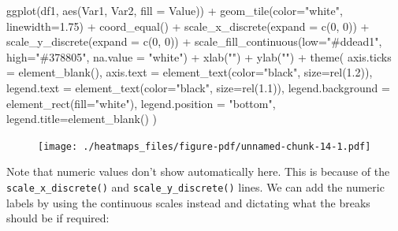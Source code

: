 \documentclass[
  letterpaper,
  DIV=11,
  numbers=noendperiod]{scrreprt}
\newenvironment{Shaded}{\begin{snugshade}}{\end{snugshade}}
\newcommand{\AttributeTok}[1]{\textcolor[rgb]{0.40,0.45,0.13}{#1}}
\newcommand{\DecValTok}[1]{\textcolor[rgb]{0.68,0.00,0.00}{#1}}
\newcommand{\FloatTok}[1]{\textcolor[rgb]{0.68,0.00,0.00}{#1}}
\newcommand{\FunctionTok}[1]{\textcolor[rgb]{0.28,0.35,0.67}{#1}}
\newcommand{\NormalTok}[1]{\textcolor[rgb]{0.00,0.23,0.31}{#1}}
\newcommand{\SpecialCharTok}[1]{\textcolor[rgb]{0.37,0.37,0.37}{#1}}
\newcommand{\StringTok}[1]{\textcolor[rgb]{0.13,0.47,0.30}{#1}}
\begin{document}
\begin{Shaded}
\begin{Highlighting}[]
\FunctionTok{ggplot}\NormalTok{(df1, }\FunctionTok{aes}\NormalTok{(Var1, Var2, }\AttributeTok{fill =}\NormalTok{ Value)) }\SpecialCharTok{+} 
  \FunctionTok{geom\_tile}\NormalTok{(}\AttributeTok{color=}\StringTok{"white"}\NormalTok{, }\AttributeTok{linewidth=}\FloatTok{1.75}\NormalTok{) }\SpecialCharTok{+}
  \FunctionTok{coord\_equal}\NormalTok{() }\SpecialCharTok{+}
  \FunctionTok{scale\_x\_discrete}\NormalTok{(}\AttributeTok{expand =} \FunctionTok{c}\NormalTok{(}\DecValTok{0}\NormalTok{, }\DecValTok{0}\NormalTok{)) }\SpecialCharTok{+}
  \FunctionTok{scale\_y\_discrete}\NormalTok{(}\AttributeTok{expand =} \FunctionTok{c}\NormalTok{(}\DecValTok{0}\NormalTok{, }\DecValTok{0}\NormalTok{)) }\SpecialCharTok{+} 
  \FunctionTok{scale\_fill\_continuous}\NormalTok{(}\AttributeTok{low=}\StringTok{"\#ddead1"}\NormalTok{, }\AttributeTok{high=}\StringTok{"\#378805"}\NormalTok{, }\AttributeTok{na.value =} \StringTok{"white"}\NormalTok{) }\SpecialCharTok{+}
  \FunctionTok{xlab}\NormalTok{(}\StringTok{""}\NormalTok{) }\SpecialCharTok{+} 
  \FunctionTok{ylab}\NormalTok{(}\StringTok{""}\NormalTok{) }\SpecialCharTok{+}
  \FunctionTok{theme}\NormalTok{(}
    \AttributeTok{axis.ticks =} \FunctionTok{element\_blank}\NormalTok{(), }
    \AttributeTok{axis.text =} \FunctionTok{element\_text}\NormalTok{(}\AttributeTok{color=}\StringTok{"black"}\NormalTok{, }\AttributeTok{size=}\FunctionTok{rel}\NormalTok{(}\FloatTok{1.2}\NormalTok{)),}
    \AttributeTok{legend.text =} \FunctionTok{element\_text}\NormalTok{(}\AttributeTok{color=}\StringTok{"black"}\NormalTok{, }\AttributeTok{size=}\FunctionTok{rel}\NormalTok{(}\FloatTok{1.1}\NormalTok{)),}
    \AttributeTok{legend.background =} \FunctionTok{element\_rect}\NormalTok{(}\AttributeTok{fill=}\StringTok{"white"}\NormalTok{),}
    \AttributeTok{legend.position =} \StringTok{"bottom"}\NormalTok{,}
    \AttributeTok{legend.title=}\FunctionTok{element\_blank}\NormalTok{()}
\NormalTok{  )}
\end{Highlighting}
\end{Shaded}

\begin{figure}[H]

{\centering \texttt{[image: ./heatmaps\_files/figure-pdf/unnamed-chunk-14-1.pdf]}

}

\end{figure}

Note that numeric values don't show automatically here. This is because
of the \texttt{scale\_x\_discrete()} and \texttt{scale\_y\_discrete()}
lines. We can add the numeric labels by using the continuous scales
instead and dictating what the breaks should be if required:
\end{document}
